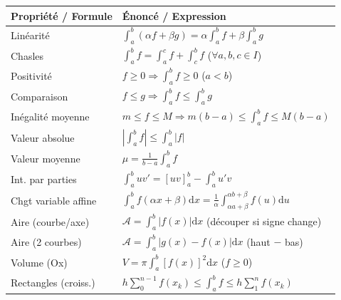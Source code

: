 \documentclass[11pt]{article}
\begin{document}
\begin{propriete}
\begin{center}
\begin{tabularx}{\linewidth}{|l|X|}
\hline
\rowcolor{popblueL} \textbf{Propriété / Formule} & \textbf{Énoncé / Expression} \\
\hline
Linéarité & $\int_a^b(\alpha f+\beta g)=\alpha\int_a^b f+\beta\int_a^b g$ \\
\hline
Chasles & $\int_a^b f=\int_a^c f+\int_c^b f$ ($\forall a,b,c\in I$) \\
\hline
Positivité & $f\ge 0 \Rightarrow \int_a^b f\ge 0$ ($a<b$) \\
\hline
Comparaison & $f\le g \Rightarrow \int_a^b f\le\int_a^b g$ \\
\hline
Inégalité moyenne & $m\le f\le M \Rightarrow m(b-a)\le\int_a^b f\le M(b-a)$ \\
\hline
Valeur absolue & $\left|\int_a^b f\right|\le \int_a^b |f|$ \\
\hline
Valeur moyenne & $\mu=\frac{1}{b-a}\int_a^b f$ \\
\hline
Int. par parties & $\int_a^b u v' = [uv]_a^b - \int_a^b u' v$ \\
\hline
Chgt variable affine & $\int_a^b f(\alpha x+\beta)\mathrm{d}x = \frac{1}{\alpha}\int_{\alpha a+\beta}^{\alpha b+\beta} f(u)\mathrm{d}u$ \\
\hline
Aire (courbe/axe) & $\mathcal{A}=\int_a^b |f(x)|\mathrm{d}x$ (découper si signe change) \\
\hline
Aire (2 courbes) & $\mathcal{A}=\int_a^b |g(x)-f(x)|\mathrm{d}x$ (haut $-$ bas) \\
\hline
Volume (Ox) & $V=\pi\int_a^b [f(x)]^2\mathrm{d}x$ ($f\ge 0$) \\
\hline
Rectangles (croiss.) & $h\sum_{0}^{n-1}f(x_k) \le \int_a^b f \le h\sum_{1}^{n}f(x_k)$ \\
\hline
\end{tabularx}
\end{center}
\end{propriete}
\end{document}
